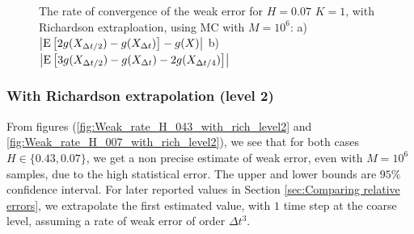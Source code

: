 \documentclass[11pt]{article}
\newcommand{\expt}[1]{\mathrm{E}\left[#1\right]}
\begin{document}
\begin{figure}[h!]
	\caption{The rate of convergence of the weak error for $H=0.07$ $K=1$, with Richardson extraploation, using MC with $M=10^6$: a) $\abs{\expt{2 g(X_{\Delta t/2}) -g(X_{\Delta t})}-g(X)}$  b) $\abs{\expt{3 g(X_{\Delta t/2})-g(X_{\Delta t})-2 g(X_{\Delta t/4})}}$ }
	\label{fig:Weak_rate_H_007_with_rich}
\end{figure}




\newpage
\subsubsection*{With Richardson extrapolation (level 2)}
From figures (\ref{fig:Weak_rate_H_043_with_rich_level2} and \ref{fig:Weak_rate_H_007_with_rich_level2}), we see that for both cases $H \in \{0.43,0.07\}$, we get a non precise estimate of weak error, even with $M=10^6$ samples, due to the high statistical error. The upper and lower bounds are $95\%$ confidence interval. For later reported values in Section \ref{sec:Comparing relative errors}, we extrapolate the first estimated value, with $1$ time step at the coarse level, assuming a rate of weak error of order $\Delta t ^3$.
\end{document}
